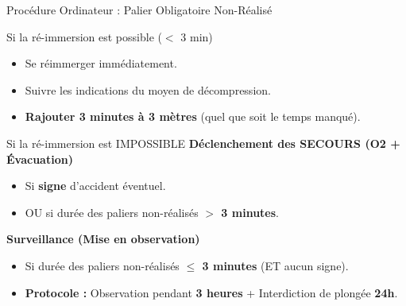\begin{frame}{Procédure Ordinateur : Palier Obligatoire Non-Réalisé}
    \small
    \begin{block}{Si la ré-immersion est possible ($<$ 3 min)}
        \begin{itemize}
            \item Se réimmerger immédiatement.
            \item Suivre les indications du moyen de décompression.
            \item \textbf{Rajouter 3 minutes à 3 mètres} (quel que soit le temps manqué).
        \end{itemize}
    \end{block}
    \vspace{-0.1cm}
    \begin{alertblock}{Si la ré-immersion est IMPOSSIBLE}
        \textbf{Déclenchement des SECOURS (O2 + Évacuation)}
        \begin{itemize}
            \item Si \textbf{signe} d'accident éventuel.
            \item OU si durée des paliers non-réalisés \textbf{$>$ 3 minutes}.
        \end{itemize}
        
        \textbf{Surveillance (Mise en observation)}
        \begin{itemize}
            \item Si durée des paliers non-réalisés \textbf{$\le$ 3 minutes} (ET aucun signe).
            \item \textbf{Protocole :} Observation pendant \textbf{3 heures} + Interdiction de plongée \textbf{24h}.
        \end{itemize}
    \end{alertblock}
\end{frame}

